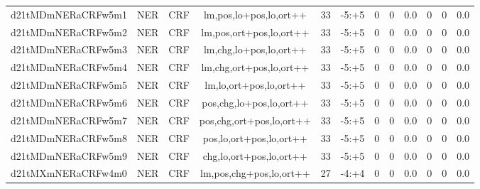 \documentclass[a4paper]{article}
\begin{document}
\begin{landscape}
\begin{center}
\begin{tabular}{ |c|c|c|c|c|c|c|c|c|c|c|c|}
 
 	
 	\small{ d21tMDmNERaCRFw5m1 } & \small{ NER} & \small{  CRF }  & lm,pos,lo+pos,lo,ort++  &  33 &  \small{  -5:+5 }  &  0 & 0 & 0.0  &  0 & 0 & 0.0 \\
 	

 
 	
 	\small{ d21tMDmNERaCRFw5m2 } & \small{ NER} & \small{  CRF }  & lm,pos,ort+pos,lo,ort++  &  33 &  \small{  -5:+5 }  &  0 & 0 & 0.0  &  0 & 0 & 0.0 \\
 	

 
 	
 	\small{ d21tMDmNERaCRFw5m3 } & \small{ NER} & \small{  CRF }  & lm,chg,lo+pos,lo,ort++  &  33 &  \small{  -5:+5 }  &  0 & 0 & 0.0  &  0 & 0 & 0.0 \\
 	

 
 	
 	\small{ d21tMDmNERaCRFw5m4 } & \small{ NER} & \small{  CRF }  & lm,chg,ort+pos,lo,ort++  &  33 &  \small{  -5:+5 }  &  0 & 0 & 0.0  &  0 & 0 & 0.0 \\
 	

 
 	
 	\small{ d21tMDmNERaCRFw5m5 } & \small{ NER} & \small{  CRF }  & lm,lo,ort+pos,lo,ort++  &  33 &  \small{  -5:+5 }  &  0 & 0 & 0.0  &  0 & 0 & 0.0 \\
 	

 
 	
 	\small{ d21tMDmNERaCRFw5m6 } & \small{ NER} & \small{  CRF }  & pos,chg,lo+pos,lo,ort++  &  33 &  \small{  -5:+5 }  &  0 & 0 & 0.0  &  0 & 0 & 0.0 \\
 	

 
 	
 	\small{ d21tMDmNERaCRFw5m7 } & \small{ NER} & \small{  CRF }  & pos,chg,ort+pos,lo,ort++  &  33 &  \small{  -5:+5 }  &  0 & 0 & 0.0  &  0 & 0 & 0.0 \\
 	

 
 	
 	\small{ d21tMDmNERaCRFw5m8 } & \small{ NER} & \small{  CRF }  & pos,lo,ort+pos,lo,ort++  &  33 &  \small{  -5:+5 }  &  0 & 0 & 0.0  &  0 & 0 & 0.0 \\
 	

 
 	
 	\small{ d21tMDmNERaCRFw5m9 } & \small{ NER} & \small{  CRF }  & chg,lo,ort+pos,lo,ort++  &  33 &  \small{  -5:+5 }  &  0 & 0 & 0.0  &  0 & 0 & 0.0 \\
 	

 
 	
 	\small{ d21tMXmNERaCRFw4m0 } & \small{ NER} & \small{  CRF }  & lm,pos,chg+pos,lo,ort++  &  27 &  \small{  -4:+4 }  &  0 & 0 & 0.0  &  0 & 0 & 0.0 \\
 	


\end{tabular}
\end{center}
\end{landscape}
\end{document}
